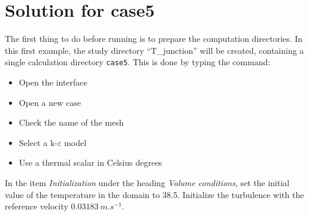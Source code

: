 
%
%
%
%


\section{Solution for case5}
The first thing to do before running \CS is to prepare the computation
directories. In this first example, the study directory ``T\_junction'' will be
created, containing a single calculation directory \texttt{case5}.
This is done by typing the command:\\


\begin{itemize}
        \item Open the \CS interface
        \item Open a new case
        \item Check the name of the mesh
        \item Select a k-$\varepsilon$ model
        \item Use a thermal scalar in Celsius degrees
\end{itemize}

In the item {\itshape Initialization} under the heading {\itshape Volume conditions}, set the initial value of the temperature
in the domain to 38.5\degresC. Initialize the turbulence with the reference
velocity $0.03183\ m.s^{-1}$.

